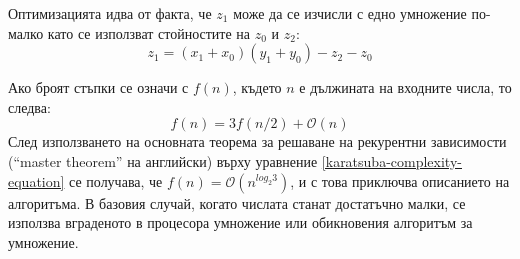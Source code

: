   Оптимизацията идва от факта, че $z_1$ може да се изчисли с едно умножение по-малко като се използват стойностите на $z_0$ и $z_2$:
  \begin{equation}
    z_1 = (x_1 + x_0)(y_1 + y_0) - z_2 - z_0
    \label{karatsuba-trick}
  \end{equation}

  Ако броят стъпки се означи с $f(n)$, където $n$ е дължината на входните числа, то следва:
  \begin{equation}
    f(n) = 3f(n/2) + \mathcal{O}(n)
    \label{karatsuba-complexity-equation}
  \end{equation}
  След използването на основната теорема за решаване на рекурентни зависимости\cite[глава~4.5]{algo-intro} (``master theorem'' на английски) върху уравнение \ref{karatsuba-complexity-equation} се получава, че $f(n) = \mathcal{O}(n^{log_2 3})$, и с това приключва описанието на алгоритъма. В базовия случай, когато числата станат достатъчно малки, се използва вграденото в процесора умножение или обикновения алгоритъм за умножение.


